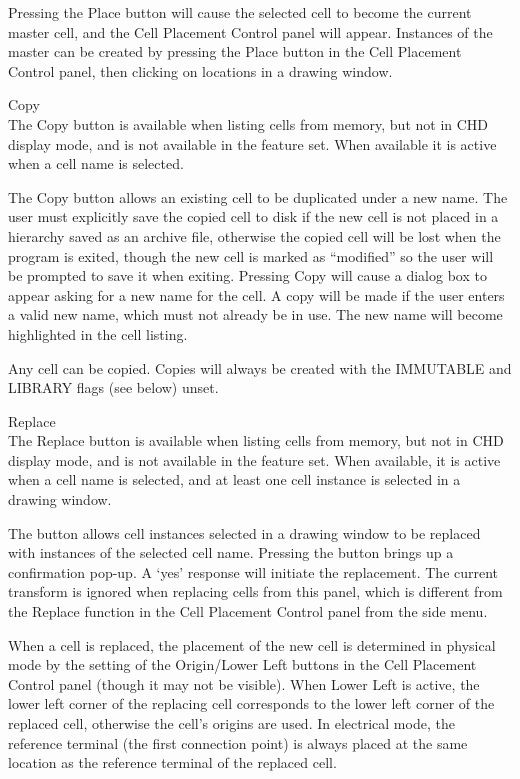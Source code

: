 \begin{description}
Pressing the {\cb Place} button will cause the selected cell to
become the current master cell, and the {\cb Cell Placement Control}
panel will appear.  Instances of the master can be created by pressing
the {\cb Place} button in the {\cb Cell Placement Control} panel, then
clicking on locations in a drawing window.

\item{\cb Copy}\\
The {\cb Copy} button is available when listing cells from memory, but
not in CHD display mode, and is not available in the {\Xiv} feature
set.  When available it is active when a cell name is selected.

The {\cb Copy} button allows an existing cell to be duplicated under a
new name.  The user must explicitly save the copied cell to disk if
the new cell is not placed in a hierarchy saved as an archive file,
otherwise the copied cell will be lost when the program is exited,
though the new cell is marked as ``modified'' so the user will be
prompted to save it when exiting.  Pressing {\cb Copy} will cause a
dialog box to appear asking for a new name for the cell.  A copy will
be made if the user enters a valid new name, which must not already be
in use.  The new name will become highlighted in the cell listing. 

Any cell can be copied.  Copies will always be created with the
IMMUTABLE and LIBRARY flags (see below) unset.

\item{\cb Replace}\\
The {\cb Replace} button is available when listing cells from memory,
but not in CHD display mode, and is not available in the {\Xiv}
feature set.  When available, it is active when a cell name is
selected, and at least one cell instance is selected in a drawing
window.

The button allows cell instances selected in a drawing window to be
replaced with instances of the selected cell name.  Pressing the
button brings up a confirmation pop-up.  A `yes' response will
initiate the replacement.  The current transform is ignored when
replacing cells from this panel, which is different from the {\cb
Replace} function in the {\cb Cell Placement Control} panel from the
side menu.

When a cell is replaced, the placement of the new cell is determined
in physical mode by the setting of the {\cb Origin}/{\cb Lower Left}
buttons in the {\cb Cell Placement Control} panel (though it may not
be visible).  When {\cb Lower Left} is active, the lower left corner
of the replacing cell corresponds to the lower left corner of the
replaced cell, otherwise the cell's origins are used.  In electrical
mode, the reference terminal (the first connection point) is always
placed at the same location as the reference terminal of the replaced
cell.


\end{description}
